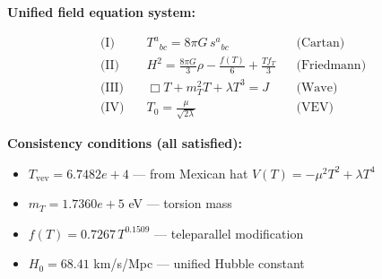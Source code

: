 
\textbf{Unified field equation system:}

\begin{align}
  \text{(I)} \quad & T^a{}_{bc} = 8\pi G \, s^a{}_{bc} && \text{(Cartan)} \\
  \text{(II)} \quad & H^2 = \frac{8\pi G}{3}\rho - \frac{f(T)}{6} + \frac{Tf_T}{3} && \text{(Friedmann)} \\
  \text{(III)} \quad & \Box T + m_T^2 T + \lambda T^3 = J && \text{(Wave)} \\
  \text{(IV)} \quad & T_0 = \frac{\mu}{\sqrt{2\lambda}} && \text{(VEV)}
\end{align}

\textbf{Consistency conditions (all satisfied):}
\begin{itemize}
  \item $T_{\text{vev}} = 6.7482e+4$ — from Mexican hat $V(T) = -\mu^2 T^2 + \lambda T^4$
  \item $m_T = 1.7360e+5$ eV — torsion mass
  \item $f(T) = 0.7267 \, T^{0.1509}$ — teleparallel modification
  \item $H_0 = 68.41$ km/s/Mpc — unified Hubble constant
\end{itemize}